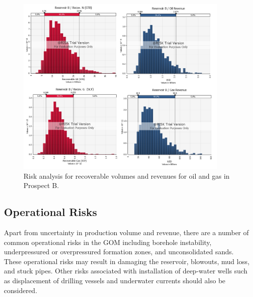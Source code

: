 \documentclass[fleqn]{article}
\begin{document}
\begin{figure}[H]
    \centering
    \includegraphics[height=3.5in]{Images/B_production.png}
    \caption{Risk analysis for recoverable volumes and revenues for oil and gas in Prospect B.}
    \label{fig:B_prod}
\end{figure}

\subsection{Operational Risks}
Apart from uncertainty in production volume and revenue, there are a number of common operational risks in the GOM including borehole instability, underpressured or overpressured formation zones, and unconsolidated sands. These operational risks may result in damaging the reservoir, blowouts, mud loss, and stuck pipes. Other risks associated with installation of deep-water wells such as displacement of drilling vessels and underwater currents should also be considered. 

\end{document}
